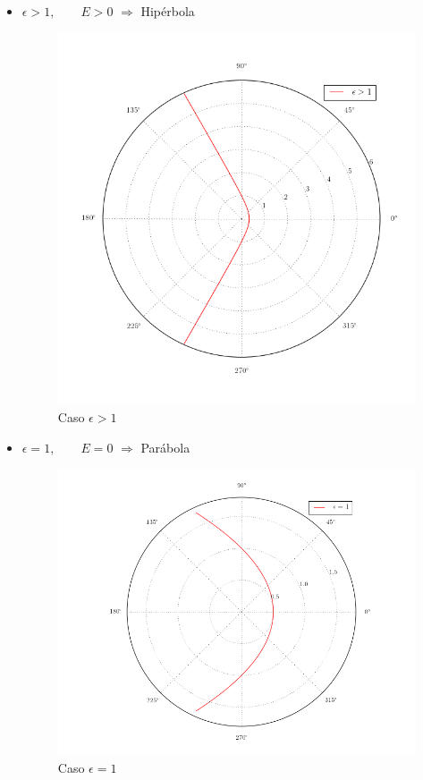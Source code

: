 \documentclass[a4paper,10pt]{article}
\numberwithin{equation}{section}
\begin{document}
\begin{itemize}
 \item $\epsilon > 1, \qquad E>0$ $\Rightarrow$ Hipérbola

\begin{figure}[H]
 \center 
 \includegraphics[scale=0.5]{problema5fig1}
 \caption{Caso $\epsilon > 1$}
\end{figure}

\newpage %

 \item $\epsilon = 1, \qquad E=0$ $\Rightarrow$ Parábola


\begin{figure}[H]
 \center 
 \includegraphics[scale=0.45]{problema5fig2}
 \caption{Caso $\epsilon = 1$}
\end{figure}


\end{itemize}
\end{document}
